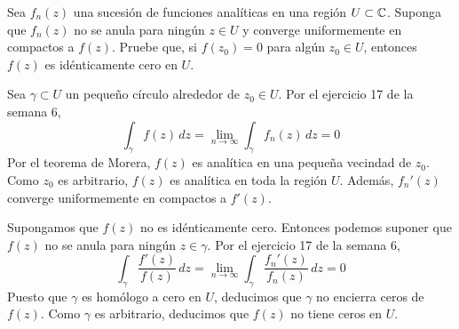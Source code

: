 \begin{exercise}
Sea $f_n(z)$ una sucesión de funciones analíticas en una región $U \subset \mathbb C$. Suponga que $f_n(z)$ no se anula para ningún $z \in U$ y converge uniformemente en compactos a $f(z)$. Pruebe que, si $f(z_0) = 0$ para algún $z_0 \in U$, entonces $f(z)$ es idénticamente cero en $U$.
\end{exercise}

\begin{solution}
Sea $\gamma \subset U$ un pequeño círculo alrededor de $z_0 \in U$. Por el ejercicio 17 de la semana 6,
$$\int_\gamma f(z) \, dz = \lim_{n \to \infty} \int_\gamma f_n(z) \, dz = 0$$
Por el teorema de Morera, $f(z)$ es analítica en una pequeña vecindad de $z_0$. Como $z_0$ es arbitrario, $f(z)$ es analítica en toda la región $U$. Además, $f_n'(z)$ converge uniformemente en compactos a $f'(z)$.

Supongamos que $f(z)$ no es idénticamente cero. Entonces podemos suponer que $f(z)$ no se anula para ningún $z \in \gamma$. Por el ejercicio 17 de la semana 6,
$$\int_\gamma \frac {f'(z)} {f(z)} \, dz = \lim_{n \to \infty} \int_\gamma \frac {f_n'(z)} {f_n(z)} \, dz = 0$$
Puesto que $\gamma$ es homólogo a cero en $U$, deducimos que $\gamma$ no encierra ceros de $f(z)$. Como $\gamma$ es arbitrario, deducimos que $f(z)$ no tiene ceros en $U$.
\end{solution}
